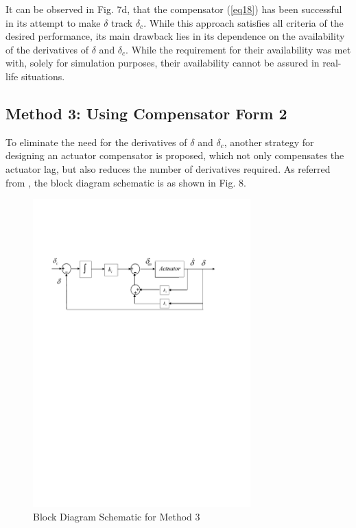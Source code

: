 \documentclass[conference]{IEEEtran}
\begin{document}
It can be observed in Fig. 7d, that the compensator (\ref{eq18}) has been successful in its attempt to make $\delta$ track $\delta_c$. 
While this approach satisfies all criteria of the desired performance, its main drawback lies in its dependence on the availability of the derivatives of $\delta$ and $\delta_c$. While the requirement for their availability was met with, solely for simulation purposes, their availability cannot be assured in real-life situations.
\subsection{Method 3: Using Compensator Form 2}
To eliminate the need for the derivatives of $\delta$ and $\delta_c$, another strategy for designing an actuator compensator is proposed, which not only compensates the actuator lag, but also reduces the number of derivatives required. As referred from \cite{ogata2010}, the block diagram schematic is as shown in Fig. 8.
\begin{figure}[h]
\begin{center}
\includegraphics[width=8.4cm]{fig9}   %
\caption{Block Diagram Schematic for Method 3} 
\label{fig8}
\end{center}
\end{figure}
\end{document}
